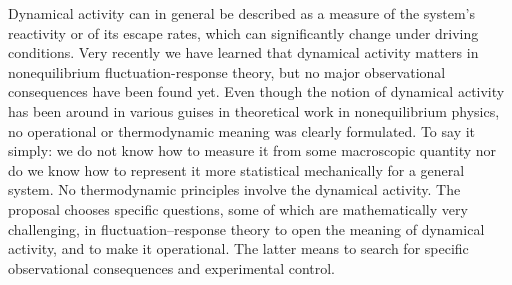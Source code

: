 Dynamical activity can in general be described as a measure of the system’s reactivity or of its escape rates, which can significantly change under driving conditions. Very recently we have learned that dynamical activity matters in nonequilibrium fluctuation-response theory, but no major observational consequences have been found yet.
Even though the notion of dynamical activity has been around in various guises in theoretical work in nonequilibrium physics, no operational or thermodynamic meaning was clearly formulated. To say it simply: we do not know how to measure it from some macroscopic quantity nor do we know how to represent it more statistical mechanically for a general system. No thermodynamic principles involve the dynamical activity.  The proposal chooses specific questions, some of which are mathematically very challenging, in fluctuation–response theory to open the meaning of dynamical activity, and to make it operational. The latter means to search for specific observational consequences and experimental control.\\
